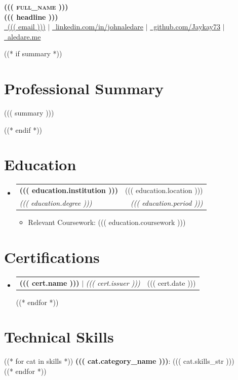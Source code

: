 \documentclass[letterpaper,11pt]{article}
\makeatletter
\newcommand{\resumeItem}[1]{
  \item\small{
    {#1 \vspace{-2pt}}
  }
}
\newcommand{\resumeSubheading}[4]{
  \vspace{-2pt}\item
    \begin{tabular*}{0.97\textwidth}[t]{l@{\extracolsep{\fill}}r}
      \textbf{#1} & #2 \\
      \textit{\small#3} & \textit{\small #4} \\
    \end{tabular*}\vspace{-7pt}
}
\newcommand{\resumeProjectHeading}[2]{
    \item
    \begin{tabular*}{0.97\textwidth}{l@{\extracolsep{\fill}}r}
      \small#1 & #2 \\
    \end{tabular*}\vspace{-7pt}
}
\newcommand{\resumeSubHeadingListStart}{\begin{itemize}[leftmargin=0.15in, label={}]}
\newcommand{\resumeSubHeadingListEnd}{\end{itemize}}
\newcommand{\resumeItemListStart}{\begin{itemize}}
\newcommand{\resumeItemListEnd}{\end{itemize}\vspace{-5pt}}
\makeatother
\begin{document}
\begin{center}
    \textbf{\Huge \scshape ((( full_name )))} \\ \vspace{3pt}
    \small \textbf{((( headline )))} \\ \vspace{2pt}
    \small \href{mailto:((( email )))}{\faEnvelope\ ((( email )))} $|$ 
    \href{((( linkedin_url )))}{\faLinkedin\ linkedin.com/in/johnaledare} $|$
    \href{((( github_url )))}{\faGithub\ github.com/Jaykay73} $|$
    \href{((( portfolio_url )))}{\faGlobe\ aledare.me}
\end{center}

((* if summary *))
\section{Professional Summary}
\begin{itemize}[leftmargin=0.15in, label={}]
    \small{\item{((( summary )))}}
\end{itemize}
((* endif *))

\section{Education}
  \resumeSubHeadingListStart
    \resumeSubheading
      {((( education.institution )))}{((( education.location )))}
      {((( education.degree )))}{((( education.period )))}
      \resumeItemListStart
        \resumeItem{Relevant Coursework: ((( education.coursework )))}
      \resumeItemListEnd
  \resumeSubHeadingListEnd

\section{Certifications}
  \resumeSubHeadingListStart
    ((* for cert in certifications *))
    \resumeProjectHeading
      {\textbf{((( cert.name )))} $|$ \emph{((( cert.issuer )))}}
      {((( cert.date )))}
    ((* endfor *))
  \resumeSubHeadingListEnd

\section{Technical Skills}
 \begin{itemize}[leftmargin=0.15in, label={}]
    \small{\item{
    ((* for cat in skills *))
     \textbf{((( cat.category_name )))}{: ((( cat.skills_str )))} \\
    ((* endfor *))
    }}
 \end{itemize}
\end{document}

